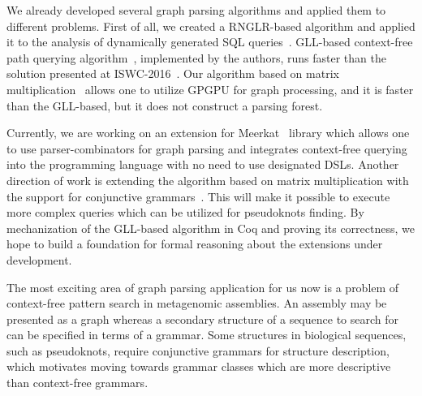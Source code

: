 \documentclass{vldb}
\begin{document}
We already developed several graph parsing algorithms and applied them to different problems. 
First of all, we created a RNGLR-based algorithm and applied it to the analysis of dynamically generated SQL queries~\cite{RelaxedRNGLR}.
GLL-based context-free path querying algorithm~\cite{GraphGLL}, implemented by the authors, runs faster than the solution presented at ISWC-2016~\cite{CFRDFParsing}. 
Our algorithm based on matrix multiplication~\cite{GraphParsingMatrix} allows one to utilize GPGPU for graph processing, and it is faster than the GLL-based, but it does not construct a parsing forest.

Currently, we are working on an extension for Meerkat~\cite{Meerkat} library which allows one to use parser-combinators for graph parsing and integrates context-free querying into the programming language with no need to use designated DSLs.
Another direction of work is extending the algorithm based on matrix multiplication with the support for conjunctive grammars~\cite{Okhotin}.
This will make it possible to execute more complex queries which can be utilized for pseudoknots finding.
By mechanization of the GLL-based algorithm in Coq and proving its correctness, we hope to build a foundation for formal reasoning about the extensions under development.

The most exciting area of graph parsing application for us now is a problem of context-free pattern search in metagenomic assemblies. 
An assembly may be presented as a graph whereas a secondary structure of a sequence to search for can be specified in terms of a grammar. 
Some structures in biological sequences, such as pseudoknots, require conjunctive grammars for 
structure description, which motivates moving towards grammar classes which are more descriptive 
than context-free grammars.
\end{document}
